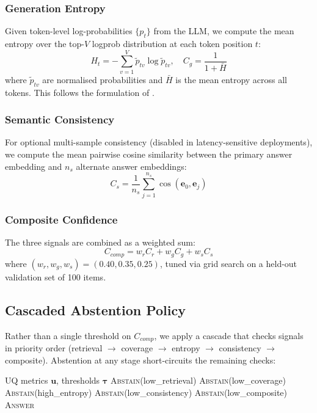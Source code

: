 \documentclass[conference]{IEEEtran}
\begin{document}
\subsubsection{Generation Entropy}
Given token-level log-probabilities $\{p_t\}$ from the LLM, we compute the
mean entropy over the top-$V$ logprob distribution at each token position $t$:
\begin{equation}
H_t = -\sum_{v=1}^{V} \tilde{p}_{tv} \log \tilde{p}_{tv}, \quad
C_g = \frac{1}{1 + \bar{H}}
\label{eq:entropy}
\end{equation}
where $\tilde{p}_{tv}$ are normalised probabilities and $\bar{H}$ is the mean
entropy across all tokens. This follows the formulation of \cite{kuhn2023semantic}.

\subsubsection{Semantic Consistency}
For optional multi-sample consistency (disabled in latency-sensitive deployments),
we compute the mean pairwise cosine similarity between the primary answer embedding
and $n_s$ alternate answer embeddings:
\begin{equation}
C_s = \frac{1}{n_s} \sum_{j=1}^{n_s} \cos(\mathbf{e}_0, \mathbf{e}_j)
\label{eq:consistency}
\end{equation}

\subsubsection{Composite Confidence}
The three signals are combined as a weighted sum:
\begin{equation}
C_{comp} = w_r C_r + w_g C_g + w_s C_s
\label{eq:composite}
\end{equation}
where $(w_r, w_g, w_s) = (0.40, 0.35, 0.25)$, tuned via grid search on a
held-out validation set of 100 items.

\subsection{Cascaded Abstention Policy}

Rather than a single threshold on $C_{comp}$, we apply a cascade that checks
signals in priority order (retrieval $\rightarrow$ coverage $\rightarrow$
entropy $\rightarrow$ consistency $\rightarrow$ composite). Abstention at any
stage short-circuits the remaining checks:

\begin{algorithm}
\caption{CascadeAbstention}
\label{alg:abstain}
\begin{algorithmic}[1]
\REQUIRE UQ metrics $\mathbf{u}$, thresholds $\boldsymbol{\tau}$
 \RETURN \textsc{Abstain}(low\_retrieval) \ENDIF
{} \RETURN \textsc{Abstain}(low\_coverage) \ENDIF
{} \RETURN \textsc{Abstain}(high\_entropy) \ENDIF
{} \RETURN \textsc{Abstain}(low\_consistency) \ENDIF
{} \RETURN \textsc{Abstain}(low\_composite) \ENDIF
\RETURN \textsc{Answer}
\end{algorithmic}
\end{algorithm}
\end{document}
